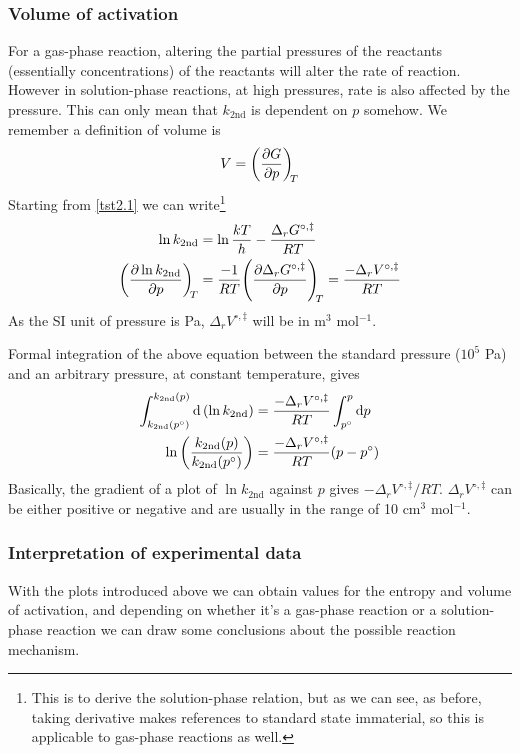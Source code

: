 \subsubsection{Volume of activation}
For a gas-phase reaction, altering the partial pressures of the reactants (essentially concentrations) of the reactants will alter the rate of reaction. However in solution-phase reactions, at high pressures, rate is also affected by the pressure. This can only mean that $k_{\text{2nd}}$ is dependent on $p$ somehow. We remember a definition of volume is 
\begin{equation}
  V=\diffp Gp[T]
\end{equation}
Starting from \cref{tst2.1} we can write\footnote{This is to derive the solution-phase relation, but as we can see, as before, taking derivative makes references to standard state immaterial, so this is applicable to gas-phase reactions as well.}
\begin{equation}
\begin{aligned}
  \ln k_{\text{2nd}}&=\ln\frac{kT}{h}-\frac{\Delta_rG^{\circ,\ddag}}{RT}\\
  \diffp{\ln k_{\text{2nd}}}{p}[T]&=\frac{-1}{RT}\diffp{\Delta_rG^{\circ,\ddag}}{p}[T]=\frac{-\Delta_rV^{\circ,\ddag}}{RT}
\end{aligned}
\end{equation}
As the SI unit of pressure is Pa, $\Delta_rV^{\circ,\ddag}$ will be in m$^3$ mol$^{-1}$.\par
Formal integration of the above equation between the standard pressure ($10^5$ Pa) and an arbitrary pressure, at constant temperature, gives
\begin{equation}
\begin{aligned}
  \int^{k_{\text{2nd}}(p)}_{k_{\text{2nd}}(p^{\circ})}\dif\ (\ln k_{\text{2nd}})&=\frac{-\Delta_rV^{\circ,\ddag}}{RT}\int^{p}_{p^{\circ}}\dif p\\
  \ln \lf(\frac{k_{\text{2nd}}(p)}{k_{\text{2nd}}(p^{\circ})} \rt)&=\frac{-\Delta_rV^{\circ,\ddag}}{RT}(p-p^{\circ})
\end{aligned}
\end{equation}
Basically, the gradient of a plot of $\ln k_{\text{2nd}}$ against $p$ gives $-\Delta_rV^{\circ,\ddag}/RT$. $\Delta_rV^{\circ,\ddag}$ can be either positive or negative and are usually in the range of 10 cm$^3$ mol$^{-1}$.
\subsubsection{Interpretation of experimental data}
With the plots introduced above we can obtain values for the entropy and volume of activation, and depending on whether it's a gas-phase reaction or a solution-phase reaction we can draw some conclusions about the possible reaction mechanism.
